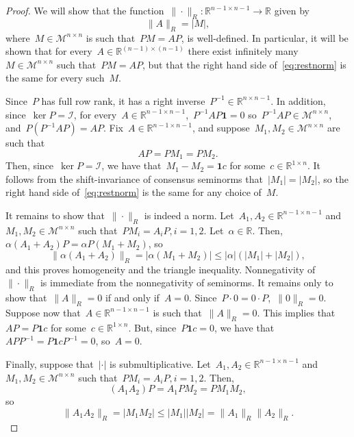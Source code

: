 \documentclass[letterpaper, 10 pt, conference]{ieeeconf}  %
\newcommand{\R}{\mathbb R}
\newcommand{\gensn}[1]{|#1|} %
\newcommand{\vecsn}[1]{|#1|} %
\newcommand{\restnorm}[1]{\|#1\|_R} %
\newcommand{\consubsp}{\mathcal{I}} %
\newcommand{\eqrowsum}{\mathcal{M}} %
\begin{document}
\begin{proof}
    We will show that the function~$\restnorm{\cdot} : \R^{n-1 \times n -1} \to \R$ given by
    \begin{equation}\label{eq:restnorm}
        \restnorm{A} = \vecsn{M},
    \end{equation}
    where~$M \in \eqrowsum^{n \times n}$ is such that~$PM = AP$, is well-defined. In particular, it will be shown that for every~$A \in \R^{(n-1) \times (n-1)}$ there exist infinitely many~$M \in \eqrowsum^{n \times n}$ such that~$PM = AP$, but that the right hand side of~\eqref{eq:restnorm} is the same for every such~$M$.
    
    Since~$P$ has full row rank, it has a right inverse~$P^{-1} \in \R^{n \times n-1}$. In addition, since~$\ker P = \consubsp$, for every~$A \in \R^{n-1 \times n-1}$,~$P^{-1}AP\mathbf{1} = 0$ so~$P^{-1}AP \in \eqrowsum^{n \times n}$, and~$P(P^{-1}AP) = AP$. Fix~$A \in \R^{n-1 \times n-1}$, and suppose~$M_1,M_2 \in \eqrowsum^{n\times n}$ are such that
    \begin{equation}
        AP = PM_1 = PM_2.
    \end{equation}
    Then, since~$\ker P = \consubsp$, we have that~$M_1-M_2 = \mathbf{1} c$ for some~$c \in \R^{1 \times n}$. It follows from the shift-invariance of consensus seminorms that~$\vecsn{M_1} = \vecsn{M_2}$, so the right hand side of~\eqref{eq:restnorm} is the same for any choice of~$M$.

    It remains to show that~$\restnorm{\cdot}$ is indeed a norm. Let~$A_1,A_2 \in \R^{n-1 \times n-1}$ and~$M_1,M_2 \in \eqrowsum^{n \times n}$ such that~$PM_i=A_iP, i=1,2$. Let~$\alpha \in \R$. Then,~$\alpha(A_1 + A_2)P = \alpha P(M_1 + M_2)$, so
    \begin{equation}
        \restnorm{\alpha(A_1 + A_2)} = \vecsn{\alpha(M_1 + M_2)} \le |\alpha|(\vecsn{M_1} + \vecsn{M_2}),
    \end{equation}
    and this proves homogeneity and the triangle inequality. Nonnegativity of~$\restnorm{\cdot}$ is immediate from the nonnegativity of seminorms. It remains only to show that~$\restnorm{A} = 0$ if and only if~$A = 0$. Since~$P \cdot 0 = 0 \cdot P$,~$\restnorm{0} = 0$. Suppose now that~$A \in \R^{n-1 \times n-1}$ is such that~$\restnorm{A} = 0$. This implies that~$AP = P\mathbf{1}c$ for some~$c \in \R^{1 \times n}$. But, since~$P\mathbf{1}c = 0$, we have that~$APP^{-1} = P\mathbf{1}cP^{-1} = 0$, so~$A = 0$.
    
    Finally, suppose that~$\gensn{\cdot}$ is submultiplicative. Let~$A_1,A_2 \in \R^{n-1 \times n-1}$ and~$M_1,M_2 \in \eqrowsum^{n \times n}$ such that~$PM_i=A_iP, i=1,2$. Then,
    \begin{equation}
        (A_1 A_2)P = A_1 PM_2 = PM_1 M_2,
    \end{equation}
    so
    \begin{equation}
        \restnorm{A_1 A_2} = \vecsn{M_1 M_2} \le \vecsn{M_1}\vecsn{M_2} = \restnorm{A_1}\restnorm{A_2}.
    \end{equation}
\end{proof}
\end{document}
